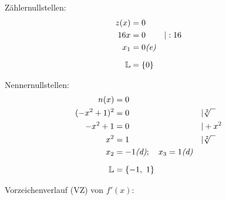 \begin{solution}{}
\begin{itemize}[leftmargin=*]
\begin{minipage}[t]{0.95\linewidth}
\begin{minipage}[t]{0.45\linewidth}
                Zählernullstellen:
                \begin{align*}
                    z(x) &= 0 \\
                    16x &= 0 &&| :16\\
                    x_1 &= 0 \text{\textit{(e)}} &&\\[1.5ex]
                    \mathbb{L} &= \left\{ 0 \right\} &&\\
                \end{align*}
            \end{minipage}
            \hfill
            \begin{minipage}[t]{0.45\linewidth}
                Nennernullstellen:
                \begin{align*}
                    n(x) &= 0 \\
                    (-x^2 + 1)^2 &= 0 &&| \sqrt[2]{\phantom{x}}\\
                    -x^2 + 1 &= 0 &&| + x^2\\
                    x^2 &= 1 &&| \sqrt[2]{\phantom{x}}\\
                    x_{2} &= -1 \text{\textit{(d)}}; \quad x_{3} = 1 \text{\textit{(d)}} &&\\[1.5ex]
                    \mathbb{L} &= \left\{ -1,\ 1 \right\} &&\\
                \end{align*}
            \end{minipage}
            Vorzeichenverlauf (VZ) von $f'(x)$:\\[-1.0ex]
\end{minipage}
\end{itemize}
\end{solution}
